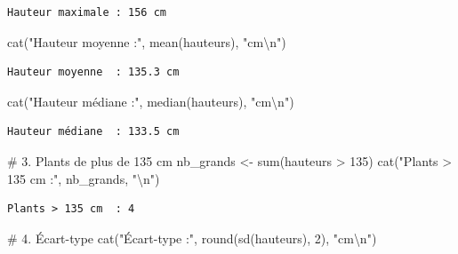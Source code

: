 \documentclass[
  french,
  11pt,
  a4paper,
]{article}
\newenvironment{Shaded}{}{}
\newcommand{\CommentTok}[1]{\textcolor[rgb]{0.42,0.45,0.49}{#1}}
\newcommand{\DecValTok}[1]{\textcolor[rgb]{0.00,0.36,0.77}{#1}}
\newcommand{\FunctionTok}[1]{\textcolor[rgb]{0.44,0.26,0.76}{#1}}
\newcommand{\NormalTok}[1]{\textcolor[rgb]{0.14,0.16,0.18}{#1}}
\newcommand{\OtherTok}[1]{\textcolor[rgb]{0.44,0.26,0.76}{#1}}
\newcommand{\SpecialCharTok}[1]{\textcolor[rgb]{0.00,0.36,0.77}{#1}}
\newcommand{\StringTok}[1]{\textcolor[rgb]{0.01,0.18,0.38}{#1}}
\begin{document}
\begin{verbatim}
Hauteur maximale : 156 cm
\end{verbatim}

\begin{Shaded}
\begin{Highlighting}[]
\FunctionTok{cat}\NormalTok{(}\StringTok{"Hauteur moyenne  :"}\NormalTok{, }\FunctionTok{mean}\NormalTok{(hauteurs), }\StringTok{"cm}\SpecialCharTok{\textbackslash{}n}\StringTok{"}\NormalTok{)}
\end{Highlighting}
\end{Shaded}

\begin{verbatim}
Hauteur moyenne  : 135.3 cm
\end{verbatim}

\begin{Shaded}
\begin{Highlighting}[]
\FunctionTok{cat}\NormalTok{(}\StringTok{"Hauteur médiane  :"}\NormalTok{, }\FunctionTok{median}\NormalTok{(hauteurs), }\StringTok{"cm}\SpecialCharTok{\textbackslash{}n}\StringTok{"}\NormalTok{)}
\end{Highlighting}
\end{Shaded}

\begin{verbatim}
Hauteur médiane  : 133.5 cm
\end{verbatim}

\begin{Shaded}
\begin{Highlighting}[]
\CommentTok{\# 3. Plants de plus de 135 cm}
\NormalTok{nb\_grands }\OtherTok{\textless{}{-}} \FunctionTok{sum}\NormalTok{(hauteurs }\SpecialCharTok{\textgreater{}} \DecValTok{135}\NormalTok{)}
\FunctionTok{cat}\NormalTok{(}\StringTok{"Plants \textgreater{} 135 cm  :"}\NormalTok{, nb\_grands, }\StringTok{"}\SpecialCharTok{\textbackslash{}n}\StringTok{"}\NormalTok{)}
\end{Highlighting}
\end{Shaded}

\begin{verbatim}
Plants > 135 cm  : 4 
\end{verbatim}

\begin{Shaded}
\begin{Highlighting}[]
\CommentTok{\# 4. Écart{-}type}
\FunctionTok{cat}\NormalTok{(}\StringTok{"Écart{-}type       :"}\NormalTok{, }\FunctionTok{round}\NormalTok{(}\FunctionTok{sd}\NormalTok{(hauteurs), }\DecValTok{2}\NormalTok{), }\StringTok{"cm}\SpecialCharTok{\textbackslash{}n}\StringTok{"}\NormalTok{)}
\end{Highlighting}
\end{Shaded}
\end{document}
